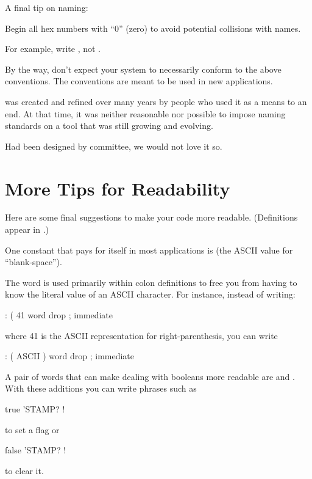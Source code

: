 \medbreak
A final tip on naming:
\begin{tip}
Begin all hex numbers with ``0'' (zero) to avoid potential collisions
with names.
\end{tip}
For example, write , not .%
%

By the way, don't expect your \Forth{} system to necessarily conform
to the above conventions.  The conventions are meant to be used in
new applications.

\Forth{} was created and refined over many years by people who used it
as a means to an end.  At that time, it was neither reasonable nor
possible to impose naming standards on a tool that was still growing
and evolving.

Had \Forth{} been designed by committee, we would not love it so.%
%

\section{More Tips for Readability}

Here are some final suggestions to make your code more readable.
(Definitions appear in .)

One constant that pays for itself in most applications is
(the ASCII value for ``blank-space'').

The word  is used primarily within colon definitions to
free you from having to know the literal value of an ASCII character.
For instance, instead of writing:
\begin{Code}
: (    41 word  drop ;  immediate
\end{Code}
where 41 is the ASCII representation for right-parenthesis, you can
write
\begin{Code}
: (    ASCII ) word  drop ;  immediate
\end{Code}
%
%
A pair of words that can make dealing with booleans more readable are
 and .  With these additions you can write
phrases such as

\begin{Code}
true 'STAMP? !
\end{Code}
to set a flag or
\begin{Code}
false 'STAMP? !
\end{Code}
to clear it.

